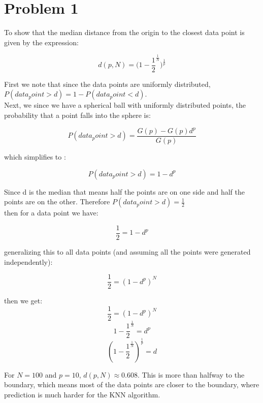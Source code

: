 \section*{Problem 1}
To show that the median distance from the origin to the closest data point is given by the expression: 

\[ d(p,N) = \bigg(1 - \frac{1}{2}^\frac{1}{N} \bigg)^\frac{1}{p} \]

First we note that since the data points are uniformly distributed, $P(data_point > d) = 1- P(data_point < d)$. \\
\noindent Next, we since we have a spherical ball with uniformly distributed points, the probability that a point falls into the sphere is:

\[ P(data_point > d) = \frac{G(p) - G(p)d^p}{G(p)} \]

\noindent which simplifies to : 

\[ P(data_point > d) = 1 - d^p \]

\noindent Since d is the median that means half the points are on one side and half the points are on the other. Therefore $P(data_point > d) = \frac{1}{2}$\\
\noindent then for a data point we have:

\[ \frac{1}{2} =  1 - d^p \]

\noindent generalizing this to all data points (and assuming all the points were generated independently):

\[ \frac{1}{2} =  (1 - d^p)^N \]

\noindent then we get:
\[ \frac{1}{2} =  (1 - d^p)^N \]
\[ 1 - \frac{1}{2}^\frac{1}{N} =  d^p \]
\[ (1 - \frac{1}{2}^\frac{1}{N})^\frac{1}{p} =  d \]

\noindent For $ N = 100$ and $p = 10$, $d(p,N) \approx 0.608$. This is more than halfway to the boundary, which means most of the data points are closer to the boundary, where prediction is much harder for the KNN algorithm.
\ 
